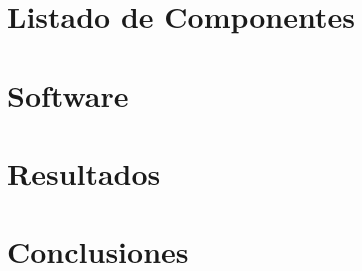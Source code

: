 \documentclass[a4paper,10pt]{article}
\begin{document}
	\section{Listado de Componentes}
	\section{Software}
	\section{Resultados}
	\section{Conclusiones}
\end{document}
